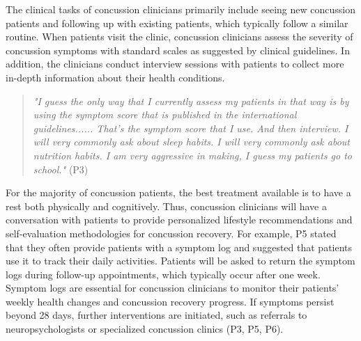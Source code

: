 The clinical tasks of concussion clinicians primarily include seeing new concussion patients and following up with existing patients, which typically follow a similar routine. 
When patients visit the clinic, concussion clinicians assess the severity of concussion symptoms with standard scales as suggested by clinical guidelines.
In addition, the clinicians conduct interview sessions with patients to collect more in-depth information about their health conditions. 
\begin{quote}
    \textit{"I guess the only way that I currently assess my patients in that way is by using the symptom score that is published in the international guidelines...... That's the symptom score that I use. And then interview. I will very commonly ask about sleep habits. I will very commonly ask about nutrition habits. I am very aggressive in making, I guess my patients go to school."} (P3)
\end{quote}
For the majority of concussion patients, the best treatment available is to have a rest both physically and cognitively. Thus, concussion clinicians will have a conversation with patients to provide personalized lifestyle recommendations and self-evaluation methodologies for concussion recovery. 
For example, P5 stated that they often provide patients with a symptom log and suggested that patients use it to track their daily activities. 
Patients will be asked to return the symptom logs during follow-up appointments, which typically occur after one week.
Symptom logs are essential for concussion clinicians to monitor their patients’ weekly health changes and concussion recovery progress.
If symptoms persist beyond 28 days, further interventions are initiated, such as referrals to neuropsychologists or specialized concussion clinics (P3, P5, P6). 
